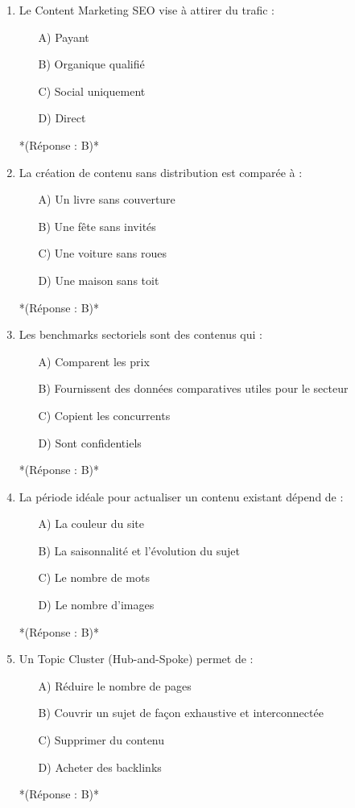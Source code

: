\documentclass[12pt,a4paper,twoside]{report}
\begin{document}
\begin{enumerate}
\item Le Content Marketing SEO vise à attirer du trafic :
\begin{itemize}
\item[A)] Payant
\item[B)] Organique qualifié
\item[C)] Social uniquement
\item[D)] Direct
\end{itemize}
*(Réponse : B)*

\item La création de contenu sans distribution est comparée à :
\begin{itemize}
\item[A)] Un livre sans couverture
\item[B)] Une fête sans invités
\item[C)] Une voiture sans roues
\item[D)] Une maison sans toit
\end{itemize}
*(Réponse : B)*

\item Les benchmarks sectoriels sont des contenus qui :
\begin{itemize}
\item[A)] Comparent les prix
\item[B)] Fournissent des données comparatives utiles pour le secteur
\item[C)] Copient les concurrents
\item[D)] Sont confidentiels
\end{itemize}
*(Réponse : B)*

\item La période idéale pour actualiser un contenu existant dépend de :
\begin{itemize}
\item[A)] La couleur du site
\item[B)] La saisonnalité et l'évolution du sujet
\item[C)] Le nombre de mots
\item[D)] Le nombre d'images
\end{itemize}
*(Réponse : B)*

\item Un Topic Cluster (Hub-and-Spoke) permet de :
\begin{itemize}
\item[A)] Réduire le nombre de pages
\item[B)] Couvrir un sujet de façon exhaustive et interconnectée
\item[C)] Supprimer du contenu
\item[D)] Acheter des backlinks
\end{itemize}
*(Réponse : B)*


\end{enumerate}
\end{document}
